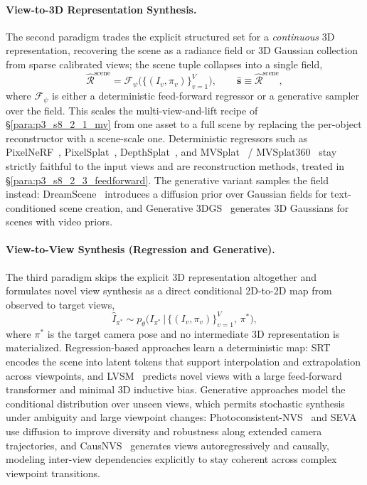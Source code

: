\paragraph{View-to-3D Representation Synthesis.}
\label{para:p3_s8_2_2_view3d}
The second paradigm trades the explicit structured set for a \emph{continuous} 3D representation, recovering the scene as a radiance field or 3D Gaussian collection from sparse calibrated views; the scene tuple collapses into a single field,
\begin{equation}
\hat{\mathcal{R}}^{\text{scene}} = \mathcal{F}_\psi\!\Big(\big\{(I_v,\pi_v)\big\}_{v=1}^V\Big),
\qquad \hat{\mathbf{s}}\equiv \hat{\mathcal{R}}^{\text{scene}},
\label{eq:p3_s8_2_2_view3d_objective}
\end{equation}
where $\mathcal{F}_\psi$ is either a deterministic feed-forward regressor or a generative sampler over the field.
This scales the multi-view-and-lift recipe of §\ref{para:p3_s8_2_1_mv} from one asset to a full scene by replacing the per-object reconstructor with a scene-scale one.
Deterministic regressors such as PixelNeRF~\cite{yu2021pixelnerf}, PixelSplat~\cite{charatan2024pixelsplat}, DepthSplat~\cite{xu2024depthsplat}, and MVSplat~\cite{chen2024mvsplat} / MVSplat360~\cite{chen2024mvsplat360} stay strictly faithful to the input views and are reconstruction methods, treated in §\ref{para:p3_s8_2_3_feedforward}.
The generative variant samples the field instead: DreamScene~\cite{li2024dreamscene} introduces a diffusion prior over Gaussian fields for text-conditioned scene creation, and Generative 3DGS~\cite{Schwarz2025ggs} generates 3D Gaussians for scenes with video priors.

\paragraph{View-to-View Synthesis (Regression and Generative).}
\label{para:p3_s8_2_2_viewview}
The third paradigm skips the explicit 3D representation altogether and formulates novel view synthesis as a direct conditional 2D-to-2D map from observed to target views,
\begin{equation}
\hat{I}_{\pi^*}\sim p_\theta\!\Big(I_{\pi^*}\,\Big|\,\big\{(I_v,\pi_v)\big\}_{v=1}^V,\,\pi^*\Big),
\label{eq:p3_s8_2_2_viewview_objective}
\end{equation}
where $\pi^*$ is the target camera pose and no intermediate 3D representation is materialized.
Regression-based approaches learn a deterministic map: SRT~\cite{sajjadi2022scene} encodes the scene into latent tokens that support interpolation and extrapolation across viewpoints, and LVSM~\cite{jin2025lvsm} predicts novel views with a large feed-forward transformer and minimal 3D inductive bias.
Generative approaches model the conditional distribution over unseen views, which permits stochastic synthesis under ambiguity and large viewpoint changes: Photoconsistent-NVS~\cite{yu2023long} and SEVA~\cite{zhou2025stable} use diffusion to improve diversity and robustness along extended camera trajectories, and CausNVS~\cite{kong2025causnvs} generates views autoregressively and causally, modeling inter-view dependencies explicitly to stay coherent across complex viewpoint transitions.

